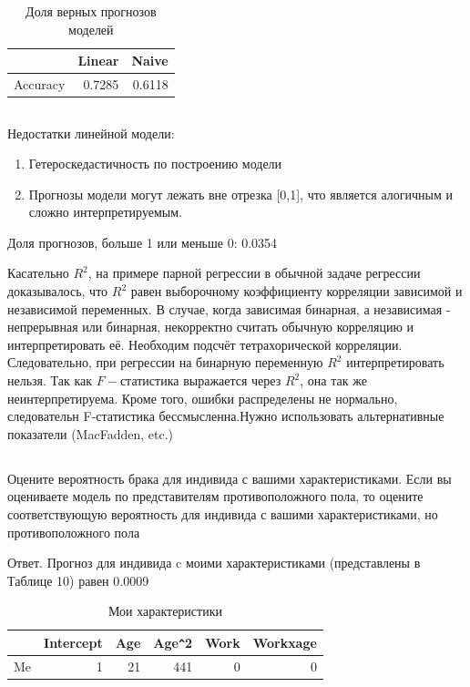 \documentclass[a4paper,12pt]{article}
\begin{document}
\begin{table}[ht]
	\centering
	\begin{tabular}{|rrr|}
		\hline
		& Linear & Naive \\ 
		\hline
		Accuracy & 0.7285 & 0.6118 \\ 
		\hline
	\end{tabular}
\caption{Доля верных прогнозов моделей}
\end{table}


\subsection{}
Недостатки линейной модели:

\begin{enumerate}[\Sun]
	\item Гетероскедастичность по построению модели
	\item Прогнозы модели могут лежать вне отрезка [0,1], что является алогичным и сложно интерпретируемым.
\end{enumerate}

Доля прогнозов, больше 1 или меньше 0: 0.0354

Касательно $ R^2 $, на примере парной регрессии в обычной задаче регрессии доказывалось, что $ R^2 $ равен выборочному коэффициенту корреляции зависимой и независимой переменных. В случае, когда зависимая бинарная, а независимая - непрерывная или бинарная, некорректно считать обычную корреляцию и интерпретировать её. Необходим подсчёт тетрахорической корреляции. Следовательно, при регрессии на бинарную переменную $ R^2 $ интерпретировать нельзя. Так как $ F- $статистика выражается через $ R^2 $, она так же неинтерпретируема. Кроме того, ошибки распределены не нормально, следовательн F-статистика бессмысленна.Нужно использовать альтернативные показатели (MacFadden, etc.)


\subsection{}

\Sun Оцените вероятность брака для индивида с вашими характеристиками. Если
вы оцениваете модель по представителям противоположного пола, то оцените
соответствующую вероятность для индивида с вашими характеристиками, но
противоположного пола

Ответ. Прогноз для индивида c моими характеристиками (представлены в Таблице 10) равен 0.0009


\begin{table}[ht]
	\centering
	\begin{tabular}{|rrrrrr|}
		\hline
		& Intercept & Age & Age\verb|^|2 & Work & Workxage \\ 
		\hline
		Me & 1 & 21 & 441 & 0 & 0 \\ 
		\hline
	\end{tabular}
\caption{Мои  характеристики}
\end{table}
\end{document}
